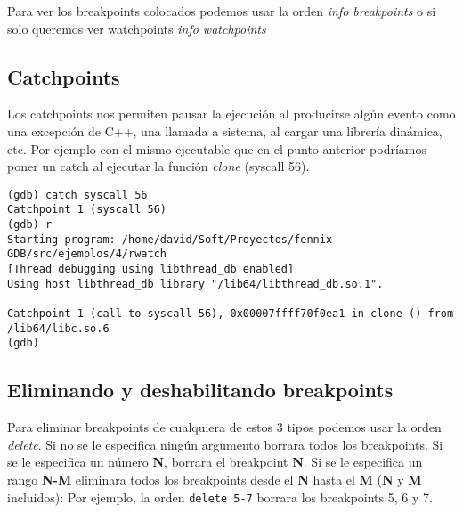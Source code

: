 Para ver los breakpoints colocados podemos usar la orden \emph{info breakpoints} o si solo queremos ver watchpoints \emph{info watchpoints}


\subsection{Catchpoints}
Los catchpoints nos permiten pausar la ejecución al producirse algún evento como una excepción de C++, una llamada a sistema, al cargar una librería dinámica, etc. Por ejemplo con el mismo ejecutable que en el punto anterior podríamos poner un catch al ejecutar la función \emph{clone} (syscall 56).
\begin{verbatim}
(gdb) catch syscall 56
Catchpoint 1 (syscall 56)
(gdb) r
Starting program: /home/david/Soft/Proyectos/fennix-GDB/src/ejemplos/4/rwatch 
[Thread debugging using libthread_db enabled]
Using host libthread_db library "/lib64/libthread_db.so.1".

Catchpoint 1 (call to syscall 56), 0x00007ffff70f0ea1 in clone () from /lib64/libc.so.6
(gdb) 
\end{verbatim}


\subsection{Eliminando y deshabilitando breakpoints}
Para eliminar breakpoints de cualquiera de estos 3 tipos podemos usar la orden \emph{delete}. Si no se le especifica ningún argumento borrara todos los breakpoints. Si se le especifica un número \textbf{N}, borrara el breakpoint \textbf{N}. Si se le especifica un rango \textbf{N-M} eliminara todos los breakpoints desde el \textbf{N} hasta el \textbf{M} (\textbf{N} y \textbf{M} incluidos): Por ejemplo, la orden \texttt{delete 5-7} borrara los breakpoints 5, 6 y 7.

